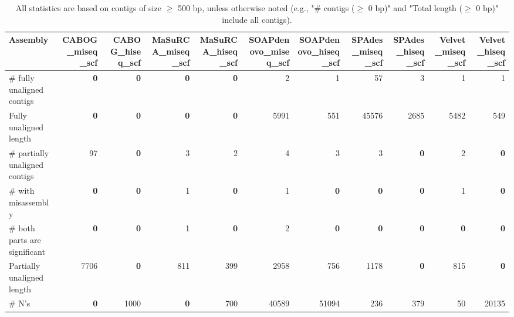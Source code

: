 \documentclass[12pt,a4paper]{article}
\begin{document}
\begin{table}[ht]
\begin{center}
\caption{All statistics are based on contigs of size $\geq$ 500 bp, unless otherwise noted (e.g., "\# contigs ($\geq$ 0 bp)" and "Total length ($\geq$ 0 bp)" include all contigs).}
\begin{tabular}{|l*{10}{|r}|}
\hline
Assembly & CABOG\_miseq\_scf & CABOG\_hiseq\_scf & MaSuRCA\_miseq\_scf & MaSuRCA\_hiseq\_scf & SOAPdenovo\_miseq\_scf & SOAPdenovo\_hiseq\_scf & SPAdes\_miseq\_scf & SPAdes\_hiseq\_scf & Velvet\_miseq\_scf & Velvet\_hiseq\_scf \\ \hline
\# fully unaligned contigs & {\bf 0} & {\bf 0} & {\bf 0} & {\bf 0} & 2 & 1 & 57 & 3 & 1 & 1 \\ \hline
Fully unaligned length & {\bf 0} & {\bf 0} & {\bf 0} & {\bf 0} & 5991 & 551 & 45576 & 2685 & 5482 & 549 \\ \hline
\# partially unaligned contigs & 97 & {\bf 0} & 3 & 2 & 4 & 3 & 3 & {\bf 0} & 2 & {\bf 0} \\ \hline
\hspace{5mm}\# with misassembly & {\bf 0} & {\bf 0} & 1 & {\bf 0} & 1 & {\bf 0} & {\bf 0} & {\bf 0} & 1 & {\bf 0} \\ \hline
\hspace{5mm}\# both parts are significant & {\bf 0} & {\bf 0} & 1 & {\bf 0} & 2 & {\bf 0} & {\bf 0} & {\bf 0} & {\bf 0} & {\bf 0} \\ \hline
Partially unaligned length & 7706 & {\bf 0} & 811 & 399 & 2958 & 756 & 1178 & {\bf 0} & 815 & {\bf 0} \\ \hline
\# N's & {\bf 0} & 1000 & {\bf 0} & 700 & 40589 & 51094 & 236 & 379 & 50 & 20135 \\ \hline
\end{tabular}
\end{center}
\end{table}
\end{document}
